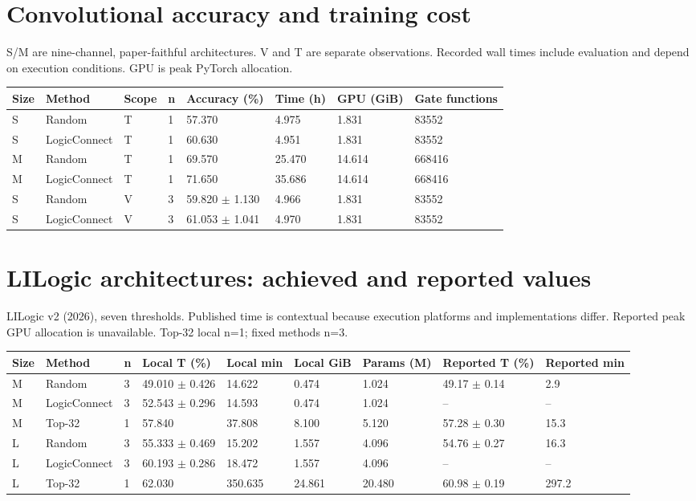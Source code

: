 \documentclass[10pt,a4paper]{article}
\begin{document}
\section*{Convolutional accuracy and training cost}
S/M are nine-channel, paper-faithful architectures. V and T are separate observations. Recorded wall times include evaluation and depend on execution conditions. GPU is peak PyTorch allocation.
\par\bigskip
\setlength{\tabcolsep}{2pt}
\begin{tabular}{@{}p{29mm}p{29.6mm}p{29.6mm}p{29.6mm}p{29.6mm}p{29.6mm}p{29.6mm}p{29.6mm}@{}}
\toprule
Size & Method & Scope & n & Accuracy (\%) & Time (h) & GPU (GiB) & Gate functions \\ \midrule
S & Random & T & 1 & 57.370 & 4.975 & 1.831 & 83552 \\
S & LogicConnect & T & 1 & 60.630 & 4.951 & 1.831 & 83552 \\
M & Random & T & 1 & 69.570 & 25.470 & 14.614 & 668416 \\
M & LogicConnect & T & 1 & 71.650 & 35.686 & 14.614 & 668416 \\
S & Random & V & 3 & 59.820 $\pm$ 1.130 & 4.966 & 1.831 & 83552 \\
S & LogicConnect & V & 3 & 61.053 $\pm$ 1.041 & 4.970 & 1.831 & 83552 \\
\bottomrule
\end{tabular}
\clearpage
\section*{LILogic architectures: achieved and reported values}
LILogic v2 (2026), seven thresholds. Published time is contextual because execution platforms and implementations differ. Reported peak GPU allocation is unavailable. Top-32 local n=1; fixed methods n=3.
\par\bigskip
\setlength{\tabcolsep}{2pt}
\begin{tabular}{@{}p{29mm}p{25.5mm}p{25.5mm}p{25.5mm}p{25.5mm}p{25.5mm}p{25.5mm}p{25.5mm}p{25.5mm}@{}}
\toprule
Size & Method & n & Local T (\%) & Local min & Local GiB & Params (M) & Reported T (\%) & Reported min \\ \midrule
M & Random & 3 & 49.010 $\pm$ 0.426 & 14.622 & 0.474 & 1.024 & 49.17 $\pm$ 0.14 & 2.9 \\
M & LogicConnect & 3 & 52.543 $\pm$ 0.296 & 14.593 & 0.474 & 1.024 & -- & -- \\
M & Top-32 & 1 & 57.840 & 37.808 & 8.100 & 5.120 & 57.28 $\pm$ 0.30 & 15.3 \\
L & Random & 3 & 55.333 $\pm$ 0.469 & 15.202 & 1.557 & 4.096 & 54.76 $\pm$ 0.27 & 16.3 \\
L & LogicConnect & 3 & 60.193 $\pm$ 0.286 & 18.472 & 1.557 & 4.096 & -- & -- \\
L & Top-32 & 1 & 62.030 & 350.635 & 24.861 & 20.480 & 60.98 $\pm$ 0.19 & 297.2 \\
\bottomrule
\end{tabular}
\clearpage
\end{document}
